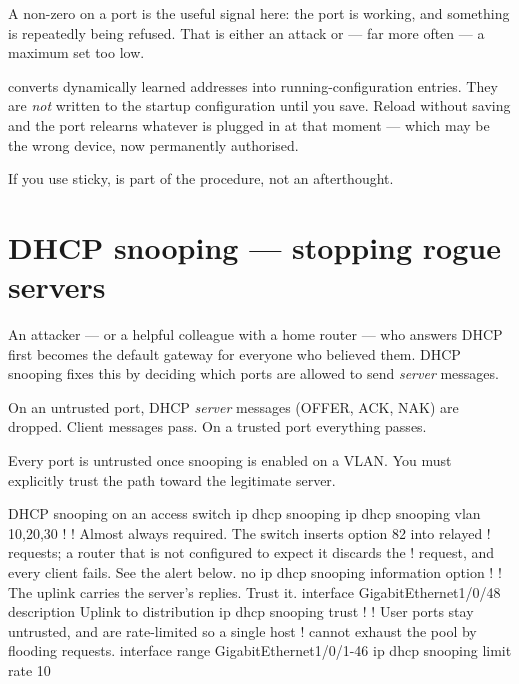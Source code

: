 A non-zero  on a  port is the useful
signal here: the port is working, and something is repeatedly being refused. That
is either an attack or --- far more often --- a maximum set too low.

\begin{alertbox}
 converts dynamically learned addresses into
running-configuration entries. They are \emph{not} written to the startup
configuration until you save. Reload without saving and the port relearns
whatever is plugged in at that moment --- which may be the wrong device, now
permanently authorised.

If you use sticky,  is part of the procedure, not an
afterthought.
\end{alertbox}

\section{DHCP snooping --- stopping rogue servers}

An attacker --- or a helpful colleague with a home router --- who answers DHCP
first becomes the default gateway for everyone who believed them. DHCP snooping
fixes this by deciding which ports are allowed to send \emph{server} messages.

\begin{definitionbox}
On an untrusted port, DHCP \emph{server} messages (OFFER, ACK, NAK) are dropped.
Client messages pass. On a trusted port everything passes.

Every port is untrusted once snooping is enabled on a VLAN. You must explicitly
trust the path toward the legitimate server.
\end{definitionbox}

\begin{config}{DHCP snooping on an access switch}
ip dhcp snooping
ip dhcp snooping vlan 10,20,30
!
! Almost always required. The switch inserts option 82 into relayed
! requests; a router that is not configured to expect it discards the
! request, and every client fails. See the alert below.
no ip dhcp snooping information option
!
! The uplink carries the server's replies. Trust it.
interface GigabitEthernet1/0/48
 description Uplink to distribution
 ip dhcp snooping trust
!
! User ports stay untrusted, and are rate-limited so a single host
! cannot exhaust the pool by flooding requests.
interface range GigabitEthernet1/0/1-46
 ip dhcp snooping limit rate 10
\end{config}

